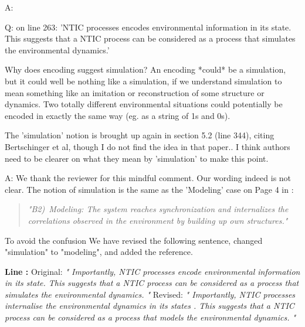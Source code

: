 \documentclass[utf8]{article}
\newcounter{cQuestion}[section]
\newenvironment{question}
    {\refstepcounter{cQuestion}\color{Blue}\noindent\newline Q\thecQuestion:}
    {~\newline}
\newenvironment{ans}  
    {\color{Black}\noindent A:}
    {~\newline}
\newcommand{\revise}[3]{
	\newline
	\newline
    \noindent
    \textbf{Line #1:}
    \newline
    Original:\newline
    \textit{"#2"}
    \newline
    \newline
    Revised:\newline
    \textit{"#3"}\newline}
\begin{document}
\begin{ans}
{			}	    		
    	\end{ans}
    
    
    	\begin{question}
    		on line 263: 'NTIC processes encodes environmental information in its state. This suggests that a NTIC process can be considered as a process that simulates the environmental dynamics.'
    		
    		Why does encoding suggest simulation? An encoding *could* be a simulation, but it could well be nothing like a simulation, if we understand simulation to mean something like an imitation or reconstruction of some structure or dynamics. Two totally different environmental situations could potentially be encoded in exactly the same way (eg. as a string of 1s and 0s).
    		
    		The 'simulation' notion is brought up again in section 5.2 (line 344), citing Bertschinger et al, though I do not find the idea in that paper.. I think authors need to be clearer on what they mean by 'simulation' to make this point.
    	\end{question}
    
    	\begin{ans}
    		We thank the reviewer for this mindful comment. 
    		Our wording indeed is not clear. The notion of simulation is the same as the 'Modeling' case on Page 4 in \cite{BERTSCHINGER.2006}: 
    		\begin{quote}
		    	\textit{"B2)~Modeling: The system reaches synchronization and internalizes the correlations observed in the environment by building up own structures."}    	
    		\end{quote}    	
    	
    		To avoid the confusion We have revised the following sentence, changed "simulation" to "modeling", and added the reference.
    		\revise{}
    		{
    			Importantly, NTIC processes encode environmental information in its state. This suggests that a NTIC process can be considered as a process that simulates the environmental dynamics. }
    		{
    			Importantly, NTIC processes internalise the environmental dynamics in its states \citep[also see P.~4][]{BERTSCHINGER.2006}. This suggests that a NTIC process can be considered as a process that models the environmental dynamics.
    		}
    	\end{ans}
    
\end{document}
